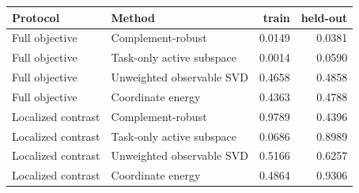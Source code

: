 \begin{tabular}{llrr}\toprule
Protocol & Method & train & held-out \\
\midrule
Full objective & Complement-robust & 0.0149 & 0.0381 \\
Full objective & Task-only active subspace & 0.0014 & 0.0590 \\
Full objective & Unweighted observable SVD & 0.4658 & 0.4858 \\
Full objective & Coordinate energy & 0.4363 & 0.4788 \\
\midrule
Localized contrast & Complement-robust & 0.9789 & 0.4396 \\
Localized contrast & Task-only active subspace & 0.0686 & 0.8989 \\
Localized contrast & Unweighted observable SVD & 0.5166 & 0.6257 \\
Localized contrast & Coordinate energy & 0.4864 & 0.9306 \\
\bottomrule\end{tabular}
